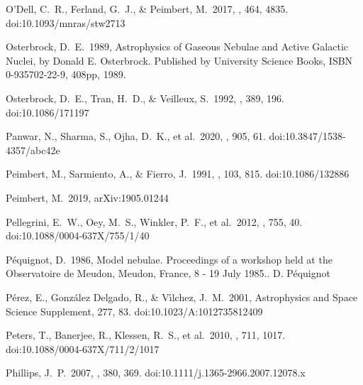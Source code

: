 \documentclass[twocolumn]{aastex62}
\begin{document}
\begin{CJK*}{UTF8}{gbsn}
\begin{thebibliography}{}
 O'Dell, C.~R., Ferland, G.~J., \& Peimbert, M.\ 2017, \mnras, 464, 4835. doi:10.1093/mnras/stw2713

 Osterbrock, D.~E.\ 1989, Astrophysics of Gaseous Nebulae and Active Galactic Nuclei, by Donald E. Osterbrock. Published by University Science Books, ISBN 0-935702-22-9, 408pp, 1989.

 Osterbrock, D.~E., Tran, H.~D., \& Veilleux, S.\ 1992, \apj, 389, 196. doi:10.1086/171197


 Panwar, N., Sharma, S., Ojha, D.~K., et al.\ 2020, \apj, 905, 61. doi:10.3847/1538-4357/abc42e

 Peimbert, M., Sarmiento, A., \& Fierro, J.\ 1991, \pasp, 103, 815. doi:10.1086/132886

 Peimbert, M.\ 2019, arXiv:1905.01244

 Pellegrini, E.~W., Oey, M.~S., Winkler, P.~F., et al.\ 2012, \apj, 755, 40. doi:10.1088/0004-637X/755/1/40

 P{\'e}quignot, D.\ 1986, Model nebulae. Proceedings of a workshop held at the Observatoire de Meudon, Meudon, France, 8 - 19 July 1985.. D. P{\'e}quignot %

 P{\'e}rez, E., Gonz{\'a}lez Delgado, R., \& V{\'\i}lchez, J.~M.\ 2001, Astrophysics and Space Science Supplement, 277, 83. doi:10.1023/A:1012735812409

 Peters, T., Banerjee, R., Klessen, R.~S., et al.\ 2010, \apj, 711, 1017. doi:10.1088/0004-637X/711/2/1017

 Phillips, J.~P.\ 2007, \mnras, 380, 369. doi:10.1111/j.1365-2966.2007.12078.x


\end{thebibliography}
\end{CJK*}
\end{document}

